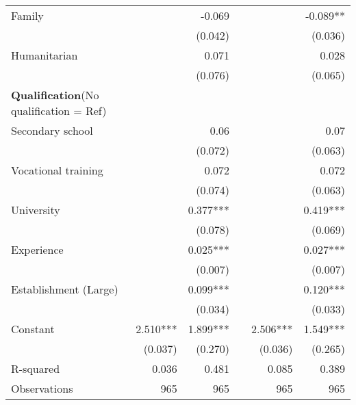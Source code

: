 \documentclass[12pt,a4paper]{article}
\begin{document}
\begin{table}[htbp]
{\begin{tabular}{p{11.7em}rrrrr}
    \multicolumn{1}{p{14em}}{Family} &       & -0.069 &       &       & -0.089** \\
                              &       & (0.042) &       &       & (0.036) \\
    \multicolumn{1}{p{14em}}{Humanitarian} &       & 0.071 &       &       & 0.028 \\
                              &       & (0.076) &       &       & (0.065) \\
    \multicolumn{1}{p{18em}}{\textbf{Qualification}(No qualification = Ref)} &       &       &       &       &  \\
    
    Secondary school &       & 0.06  &       &       & 0.07 \\
                              &       &(0.072) &       &       & (0.063) \\
    Vocational training &       & 0.072 &       &       & 0.072 \\
                              &       & (0.074) &       &       & (0.063) \\
    University &       & 0.377*** &       &       & 0.419*** \\
                              &       &(0.078) &       &       & (0.069) \\
     \multicolumn{1}{p{14em}}{Experience} &       & 0.025*** &       &       & 0.027*** \\
                              &       & (0.007) &       &       & (0.007) \\
     \multicolumn{1}{p{14em}}{Establishment (Large)} &       & 0.099*** &       &       & 0.120*** \\
                              &       &(0.034) &       &       & (0.033) \\

    Constant                  & 2.510*** & 1.899*** &       & 2.506*** & 1.549*** \\
                              & (0.037) & (0.270) &       & (0.036) & (0.265) \\
    \midrule
    R-squared                 & 0.036 & 0.481 &       & 0.085 & 0.389 \\
    Observations & 965   & 965   &       & 965   & 965 \\
    \bottomrule
    \end{tabular}%
}


\end{table}
\end{document}
